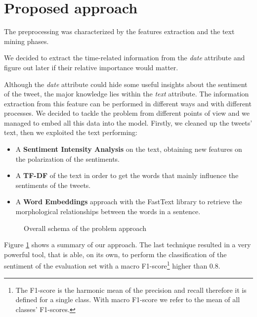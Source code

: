 \documentclass[conference]{IEEEtran}
\begin{document}
\section{Proposed approach}\label{sec:approach}
The preprocessing was characterized by the features extraction and the text mining phases.

We decided to extract the time-related information from the \textit{date} attribute and figure out later if their relative importance would matter.

Although the \textit{date} attribute could hide some useful insights about the sentiment of the tweet, the major knowledge lies within the \textit{text} attribute. The information extraction from this feature can be performed in different ways and with different processes. We decided to tackle the problem from different points of view and we managed to embed all this data into the model. Firstly, we cleaned up the tweets' text, then we exploited the text performing:
\begin{itemize}
    \item A \textbf{Sentiment Intensity Analysis}\cite{sentiment_analysis} on the text, obtaining new features on the polarization of the sentiments.
    \item A \textbf{TF-DF} %
    of the text in order to get the words that mainly influence the sentiments of the tweets.
    \item A \textbf{Word Embeddings}\cite{wordembeddings} approach with the FastText\cite{fasttext} library to retrieve the morphological relationships between the words in a sentence.
\end{itemize}
\begin{figure}[h]
        \centering
        
        \caption{Overall schema of the problem approach}
        \label{fig:overall_schema}
\end{figure}
Figure \ref{fig:overall_schema} shows a summary of our approach.
The last technique resulted in a very powerful tool, that is able, on its own, to perform the classification of the sentiment of the evaluation set with a macro F1-score\footnote{The F1-score is the harmonic mean of the precision and recall therefore it is defined for a single class. With macro F1-score we refer to the mean of all classes' F1-scores.}
higher than 0.8. %
\end{document}
